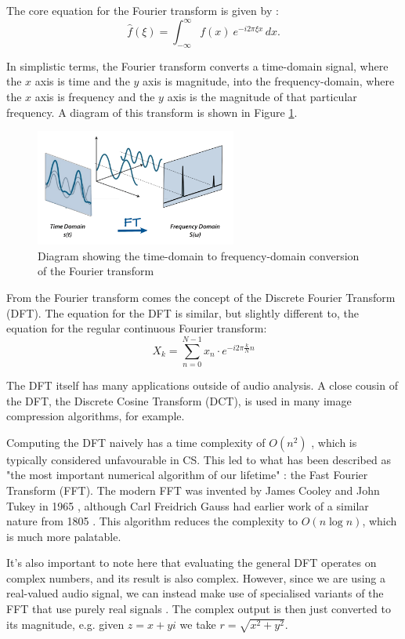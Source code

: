\documentclass[11pt]{article}
\begin{document}
The core equation for the Fourier transform is given by \cite{wolframFourierTransform}:
$$\widehat{f}(\xi) = \int_{-\infty}^{\infty} f(x)\ e^{-i 2\pi \xi x}\,dx.$$

In simplistic terms, the Fourier transform converts a time-domain signal, where the $x$ axis is time and the
$y$ axis is magnitude, into the frequency-domain, where the $x$ axis is frequency and the $y$ axis is the
magnitude of that particular frequency. A diagram of this transform is shown in Figure \ref{fig:ftdiagram}.

\begin{figure}[H]
\centering
\includegraphics[width=250px]{img/fouriertransform.png}
\caption{Diagram showing the time-domain to frequency-domain conversion of the Fourier transform}
\label{fig:ftdiagram}
\end{figure}

From the Fourier transform comes the concept of the Discrete Fourier Transform (DFT). The equation for the DFT
is similar, but slightly different to, the equation for the regular continuous Fourier transform:
$$X_k = \sum_{n=0}^{N-1} x_n \cdot e^{-i2\pi \tfrac{k}{N}n}$$

The DFT itself has many applications outside of audio analysis. A close cousin of the DFT, the Discrete Cosine
Transform (DCT), is used in many image compression algorithms, for example.

Computing the DFT naively has a time complexity of $O(n^2)$ \cite{Rajaby2022} , which is typically considered
unfavourable in CS. This led to what has been described as "the most important numerical algorithm of our
lifetime" \cite{Strang1994}: the Fast Fourier Transform (FFT). The modern FFT was invented by James Cooley and
John Tukey in 1965 \cite{Cooley1965AnAF}, although Carl Freidrich Gauss had earlier work of a similar nature
from 1805 \cite{Heideman1985}. This algorithm reduces the complexity to $O(n \log n)$, which is much more
palatable.

It's also important to note here that evaluating the general DFT operates on complex numbers, and its result
is also complex. However, since we are using a real-valued audio signal, we can instead make use of
specialised variants of the FFT that use purely real signals \cite{Sorensen1987}. The complex output is then
just converted to its magnitude, e.g. given $z = x + yi$ we take $r = \sqrt{x^2 + y^2}$.
\end{document}
